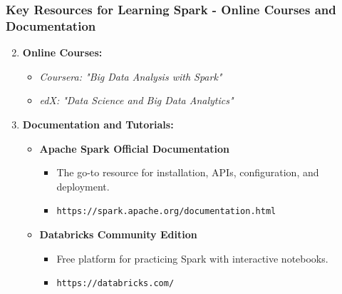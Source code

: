 \documentclass[aspectratio=169]{beamer}
\begin{document}
\begin{frame}[fragile]
    \frametitle{Key Resources for Learning Spark - Online Courses and Documentation}
    \begin{enumerate}
        \setcounter{enumi}{1}
        \item \textbf{Online Courses:}
        \begin{itemize}
            \item \textit{Coursera: "Big Data Analysis with Spark"}
            \item \textit{edX: "Data Science and Big Data Analytics"}
        \end{itemize}
        
        \item \textbf{Documentation and Tutorials:}
        \begin{itemize}
            \item \textbf{Apache Spark Official Documentation} 
            \begin{itemize}
                \item The go-to resource for installation, APIs, configuration, and deployment.
                \item \texttt{https://spark.apache.org/documentation.html}
            \end{itemize}
            \item \textbf{Databricks Community Edition}
            \begin{itemize}
                \item Free platform for practicing Spark with interactive notebooks.
                \item \texttt{https://databricks.com/}
            \end{itemize}
        \end{itemize}
    \end{enumerate}
\end{frame}
\end{document}
